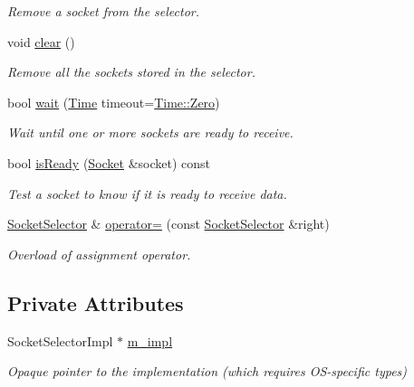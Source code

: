 \begin{DoxyCompactItemize}
\begin{DoxyCompactList}\small\item\em Remove a socket from the selector. \end{DoxyCompactList}\item 
void \mbox{\hyperlink{classsf_1_1_socket_selector_a76e650acb0199d4be91e90a493fbc91a}{clear}} ()
\begin{DoxyCompactList}\small\item\em Remove all the sockets stored in the selector. \end{DoxyCompactList}\item 
bool \mbox{\hyperlink{classsf_1_1_socket_selector_a9cfda5475f17925e65889394d70af702}{wait}} (\mbox{\hyperlink{classsf_1_1_time}{Time}} timeout=\mbox{\hyperlink{classsf_1_1_time_a8db127b632fa8da21550e7282af11fa0}{Time\+::\+Zero}})
\begin{DoxyCompactList}\small\item\em Wait until one or more sockets are ready to receive. \end{DoxyCompactList}\item 
bool \mbox{\hyperlink{classsf_1_1_socket_selector_a917a4bac708290a6782e6686fd3bf889}{is\+Ready}} (\mbox{\hyperlink{classsf_1_1_socket}{Socket}} \&socket) const
\begin{DoxyCompactList}\small\item\em Test a socket to know if it is ready to receive data. \end{DoxyCompactList}\item 
\mbox{\hyperlink{classsf_1_1_socket_selector}{Socket\+Selector}} \& \mbox{\hyperlink{classsf_1_1_socket_selector_ae6395c7a8d29a9ea14939cc5d1ba3a33}{operator=}} (const \mbox{\hyperlink{classsf_1_1_socket_selector}{Socket\+Selector}} \&right)
\begin{DoxyCompactList}\small\item\em Overload of assignment operator. \end{DoxyCompactList}\end{DoxyCompactItemize}
\subsection*{Private Attributes}
\begin{DoxyCompactItemize}
\item 
\mbox{\label{classsf_1_1_socket_selector_a5867d4d088758ef472f1cb8f5d08e053}} 
Socket\+Selector\+Impl $\ast$ \mbox{\hyperlink{classsf_1_1_socket_selector_a5867d4d088758ef472f1cb8f5d08e053}{m\+\_\+impl}}
\begin{DoxyCompactList}\small\item\em Opaque pointer to the implementation (which requires O\+S-\/specific types) \end{DoxyCompactList}\end{DoxyCompactItemize}


